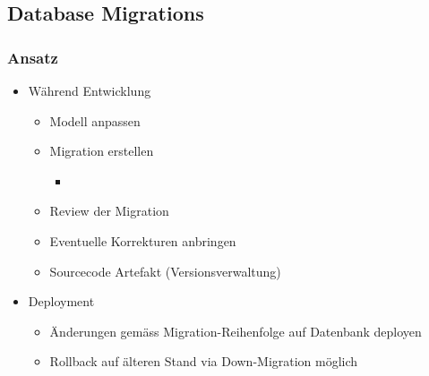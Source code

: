 \subsection{Database Migrations}
\subsubsection{Ansatz}
\begin{itemize}
    \item Während Entwicklung
    \begin{itemize}
        \item Modell anpassen
        \item Migration erstellen
        \begin{itemize}
            \item
        \end{itemize}
        \item Review der Migration
        \item Eventuelle Korrekturen anbringen
        \item Sourcecode Artefakt (Versionsverwaltung)
    \end{itemize}
    \item Deployment
    \begin{itemize}
        \item Änderungen gemäss Migration-Reihenfolge auf Datenbank deployen
        \item Rollback auf älteren Stand via Down-Migration möglich
    \end{itemize}
\end{itemize}

\newpage